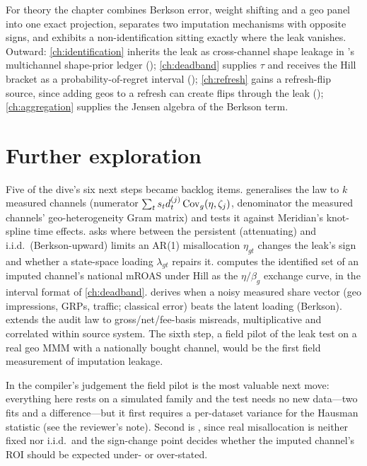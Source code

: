For theory the chapter combines Berkson error, weight shifting and a geo panel into one exact projection, separates two imputation mechanisms with opposite signs, and exhibits a non-identification sitting exactly where the leak vanishes. Outward: \cref{ch:identification} inherits the leak as cross-channel shape leakage in 's multichannel shape-prior ledger (); \cref{ch:deadband} supplies $\tau$ and receives the Hill bracket as a probability-of-regret interval (); \cref{ch:refresh} gains a refresh-flip source, since adding geos to a refresh can create flips through the leak (); \cref{ch:aggregation} supplies the Jensen algebra of the Berkson term.

\section{Further exploration}

Five of the dive's six next steps became backlog items.  generalises the law to $k$ measured channels (numerator $\sum_t s_td_t^{(j)}\operatorname{Cov}_g(\eta,\zeta_j)$, denominator the measured channels' geo-heterogeneity Gram matrix) and tests it against Meridian's knot-spline time effects.  asks where between the persistent (attenuating) and i.i.d.\ (Berkson-upward) limits an AR(1) misallocation $\eta_{gt}$ changes the leak's sign and whether a state-space loading $\lambda_{gt}$ repairs it.  computes the identified set of an imputed channel's national mROAS under Hill as the $\eta/\beta_g$ exchange curve, in the interval format of \cref{ch:deadband}.  derives when a noisy measured share vector (geo impressions, GRPs, traffic; classical error) beats the latent loading (Berkson).  extends the audit law to gross/net/fee-basis misreads, multiplicative and correlated within source system. The sixth step, a field pilot of the leak test on a real geo MMM with a nationally bought channel, would be the first field measurement of imputation leakage.

In the compiler's judgement the field pilot is the most valuable next move: everything here rests on a simulated family and the test needs no new data---two fits and a difference---but it first requires a per-dataset variance for the Hausman statistic (see the reviewer's note). Second is , since real misallocation is neither fixed nor i.i.d.\ and the sign-change point decides whether the imputed channel's ROI should be expected under- or over-stated.

